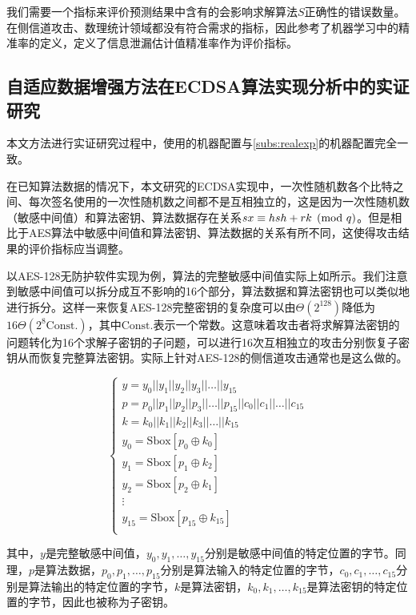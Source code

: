 {	我们需要一个指标来评价预测结果中含有的会影响求解算法$S$正确性的错误数量。在侧信道攻击、数理统计领域都没有符合需求的指标，因此参考了机器学习中的精准率的定义，定义了信息泄漏估计值精准率作为评价指标。%
	\subsection{自适应数据增强方法在ECDSA算法实现分析中的实证研究}

	本文方法进行实证研究过程中，使用的机器配置与\ref{subs:realexp}的机器配置完全一致。

	在已知算法数据的情况下，本文研究的ECDSA实现中，一次性随机数各个比特之间、每次签名使用的一次性随机数之间都不是互相独立的，这是因为一次性随机数（敏感中间值）和算法密钥、算法数据存在关系$sx\equiv hsh+rk\pmod q$。但是相比于AES算法中敏感中间值和算法密钥、算法数据的关系有所不同，这使得攻击结果的评价指标应当调整。
	
	以AES-128无防护软件实现为例，算法的完整敏感中间值实际上如所示。我们注意到敏感中间值可以拆分成互不影响的16个部分，算法数据和算法密钥也可以类似地进行拆分。这样一来恢复AES-128完整密钥的复杂度可以由$\Theta(2^{128})$降低为$16\Theta(2^8\mathrm{Const.})$，其中$\mathrm{Const.}$表示一个常数。这意味着攻击者将求解算法密钥的问题转化为16个求解子密钥的子问题，可以进行16次互相独立的攻击分别恢复子密钥从而恢复完整算法密钥。实际上针对AES-128的侧信道攻击通常也是这么做的。
	
	\begin{equation}
		\begin{cases}
			y=y_0||y_1||y_2||y_3||\dots||y_{15}\\
			p=p_0||p_1||p_2||p_3||\dots||p_{15}||c_{0}||c_1||\dots||c_{15}\\
			k=k_0||k_1||k_2||k_3||\dots||k_{15}\\
			y_0=\mathrm{Sbox}[p_0\oplus k_0]\\
			y_1=\mathrm{Sbox}[p_1\oplus k_2]\\
			y_2=\mathrm{Sbox}[p_2\oplus k_1]\\
			\vdots\\
			y_{15}=\mathrm{Sbox}[p_{15}\oplus k_{15}]\\
		\end{cases}\label{eq:fullimtermidiate}
	\end{equation}

	\noindent 其中，$y$是完整敏感中间值，$y_0,y_1,\dots,y_{15}$分别是敏感中间值的特定位置的字节。同理，$p$是算法数据，$p_0,p_1,\dots,p_{15}$分别是算法输入的特定位置的字节，$c_0,c_1,\dots,c_{15}$分别是算法输出的特定位置的字节，$k$是算法密钥，$k_0,k_1,\dots,k_{15}$是算法密钥的特定位置的字节，因此也被称为子密钥。
	
}

